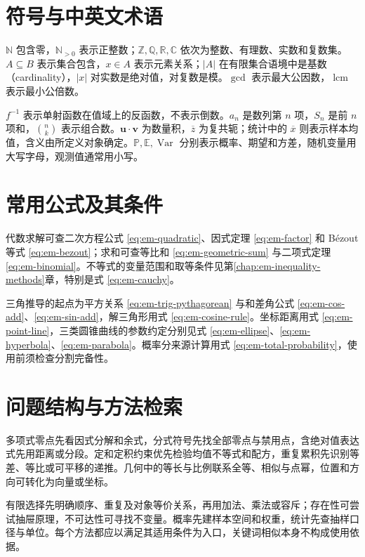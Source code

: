\documentclass[UTF8]{ctexbook}
\begin{document}
\section{符号与中英文术语}
$\mathbb N$ 包含零，$\mathbb N_{>0}$ 表示正整数；$\mathbb Z,\mathbb Q,\mathbb R,\mathbb C$ 依次为整数、有理数、实数和复数集。$A\subseteq B$ 表示集合包含，$x\in A$ 表示元素关系；$|A|$ 在有限集合语境中是基数（cardinality），$|x|$ 对实数是绝对值，对复数是模。$\gcd$ 表示最大公因数，$\operatorname{lcm}$ 表示最小公倍数。

$f^{-1}$ 表示单射函数在值域上的反函数，不表示倒数。$a_n$ 是数列第 $n$ 项，$S_n$ 是前 $n$ 项和，$\binom nk$ 表示组合数。$\boldsymbol u\cdot\boldsymbol v$ 为数量积，$\overline z$ 为复共轭；统计中的 $\overline x$ 则表示样本均值，含义由所定义对象确定。$\mathbb P,\mathbb E,\operatorname{Var}$ 分别表示概率、期望和方差，随机变量用大写字母，观测值通常用小写。

\section{常用公式及其条件}
代数求解可查二次方程公式 \eqref{eq:em-quadratic}、因式定理 \eqref{eq:em-factor} 和 Bézout 等式 \eqref{eq:em-bezout}；求和可查等比和 \eqref{eq:em-geometric-sum} 与二项式定理 \eqref{eq:em-binomial}。不等式的变量范围和取等条件见第\ref{chap:em-inequality-methods}章，特别是式 \eqref{eq:em-cauchy}。

三角推导的起点为平方关系 \eqref{eq:em-trig-pythagorean} 与和差角公式 \eqref{eq:em-cos-add}、\eqref{eq:em-sin-add}，解三角形用式 \eqref{eq:em-cosine-rule}。坐标距离用式 \eqref{eq:em-point-line}，三类圆锥曲线的参数约定分别见式 \eqref{eq:em-ellipse}、\eqref{eq:em-hyperbola}、\eqref{eq:em-parabola}。概率分来源计算用式 \eqref{eq:em-total-probability}，使用前须检查分割完备性。

\section{问题结构与方法检索}
多项式零点先看因式分解和余式，分式符号先找全部零点与禁用点，含绝对值表达式先用距离或分段。定和定积约束优先检验均值不等式和配方，重复累积先识别等差、等比或可平移的递推。几何中的等长与比例联系全等、相似与点幂，位置和方向可转化为向量或坐标。

有限选择先明确顺序、重复及对象等价关系，再用加法、乘法或容斥；存在性可尝试抽屉原理，不可达性可寻找不变量。概率先建样本空间和权重，统计先查抽样口径与单位。每个方法都应以满足其适用条件为入口，关键词相似本身不构成使用依据。
\end{document}
